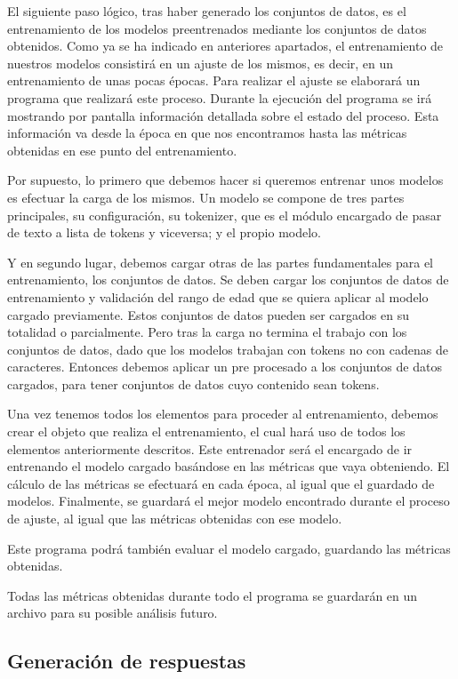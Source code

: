 El siguiente paso lógico, tras haber generado los conjuntos de datos, es el entrenamiento de los modelos preentrenados mediante los conjuntos de datos obtenidos. Como ya se ha indicado en anteriores apartados, el entrenamiento de nuestros modelos consistirá en un ajuste de los mismos, es decir, en un entrenamiento de unas pocas épocas. Para realizar el ajuste se elaborará un programa que realizará este proceso. Durante la ejecución del programa se irá mostrando por pantalla información detallada sobre el estado del proceso. Esta información va desde la época en que nos encontramos hasta las métricas obtenidas en ese punto del entrenamiento.

Por supuesto, lo primero que debemos hacer si queremos entrenar unos modelos es efectuar la carga de los mismos. Un modelo se compone de tres partes principales, su configuración, su tokenizer, que es el módulo encargado de pasar de texto a lista de tokens y viceversa; y el propio modelo.

Y en segundo lugar, debemos cargar otras de las partes fundamentales para el entrenamiento, los conjuntos de datos. Se deben cargar los conjuntos de datos de entrenamiento y validación del rango de edad que se quiera aplicar al modelo cargado previamente. Estos conjuntos de datos pueden ser cargados en su totalidad o parcialmente. Pero tras la carga no termina el trabajo con los conjuntos de datos, dado que los modelos trabajan con tokens no con cadenas de caracteres. Entonces debemos aplicar un pre procesado a los conjuntos de datos cargados, para tener conjuntos de datos cuyo contenido sean tokens.

Una vez tenemos todos los elementos para proceder al entrenamiento, debemos crear el objeto que realiza el entrenamiento, el cual hará uso de todos los elementos anteriormente descritos. Este entrenador será el encargado de ir entrenando el modelo cargado basándose en las métricas que vaya obteniendo. El cálculo de las métricas se efectuará en cada época, al igual que el guardado de modelos. Finalmente, se guardará el mejor modelo encontrado durante el proceso de ajuste, al igual que las métricas obtenidas con ese modelo.

Este programa podrá también evaluar el modelo cargado, guardando las métricas obtenidas.

Todas las métricas obtenidas durante todo el programa se guardarán en un archivo para su posible análisis futuro.

\subsection{Generación de respuestas}

